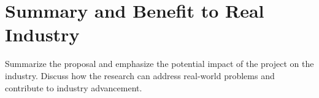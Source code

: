 \section{Summary and Benefit to Real Industry}
\label{sec:summary}
Summarize the proposal and emphasize the potential impact of the project on the industry. Discuss how the research can address real-world problems and contribute to industry advancement.
